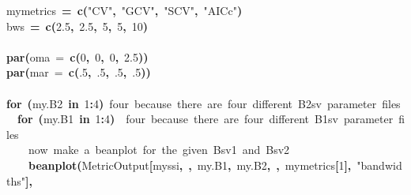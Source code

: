 \documentclass{article}
\makeatletter
\newcommand{\hlnumber}[1]{\textcolor[rgb]{0,0,0}{#1}}%
\newcommand{\hlfunctioncall}[1]{\textcolor[rgb]{0.501960784313725,0,0.329411764705882}{\textbf{#1}}}%
\newcommand{\hlstring}[1]{\textcolor[rgb]{0.6,0.6,1}{#1}}%
\newcommand{\hlkeyword}[1]{\textcolor[rgb]{0,0,0}{\textbf{#1}}}%
\newcommand{\hlargument}[1]{\textcolor[rgb]{0.690196078431373,0.250980392156863,0.0196078431372549}{#1}}%
\newcommand{\hlcomment}[1]{\textcolor[rgb]{0.180392156862745,0.6,0.341176470588235}{#1}}%
\newcommand{\hlassignement}[1]{\textcolor[rgb]{0,0,0}{\textbf{#1}}}%
\newcommand{\hlsymbol}[1]{\textcolor[rgb]{0,0,0}{#1}}%
\newcommand{\hlstd}[1]{\textcolor[rgb]{0,0,0}{#1}}%
\newenvironment{kframe}{%
 \def\FrameCommand##1{\hskip\@totalleftmargin \hskip-\fboxsep
 \colorbox{shadecolor}{##1}\hskip-\fboxsep
     \hskip-\linewidth \hskip-\@totalleftmargin \hskip\columnwidth}%
 \MakeFramed {\advance\hsize-\width
   \@totalleftmargin\z@ \linewidth\hsize
   \@setminipage}}%
 {\par\unskip\endMakeFramed}
\newenvironment{knitrout}{}{} %
\makeatother
\begin{document}
\begin{knitrout}
\begin{kframe}
\begin{flushleft}
\hlstd{}\hlsymbol{mymetrics}{\ }\hlassignement{=}{\ }\hlfunctioncall{c}\hlkeyword{(}\hlstring{"{}CV"{}}\hlkeyword{,}{\ }\hlstring{"{}GCV"{}}\hlkeyword{,}{\ }\hlstring{"{}SCV"{}}\hlkeyword{,}{\ }\hlstring{"{}AICc"{}}\hlkeyword{)}\hspace*{\fill}\\
\hlstd{}\hlsymbol{bws}{\ }\hlassignement{=}{\ }\hlfunctioncall{c}\hlkeyword{(}\hlnumber{2.5}\hlkeyword{,}{\ }\hlnumber{2.5}\hlkeyword{,}{\ }\hlnumber{5}\hlkeyword{,}{\ }\hlnumber{5}\hlkeyword{,}{\ }\hlnumber{10}\hlkeyword{)}\hspace*{\fill}\\
\hlstd{}\hspace*{\fill}\\
\hlstd{}\hlfunctioncall{par}\hlkeyword{(}\hlargument{oma}{\ }\hlargument{=}{\ }\hlfunctioncall{c}\hlkeyword{(}\hlnumber{0}\hlkeyword{,}{\ }\hlnumber{0}\hlkeyword{,}{\ }\hlnumber{0}\hlkeyword{,}{\ }\hlnumber{2.5}\hlkeyword{)}\hlkeyword{)}\hspace*{\fill}\\
\hlstd{}\hlfunctioncall{par}\hlkeyword{(}\hlargument{mar}{\ }\hlargument{=}{\ }\hlfunctioncall{c}\hlkeyword{(}\hlnumber{.5}\hlkeyword{,}{\ }\hlnumber{.5}\hlkeyword{,}{\ }\hlnumber{.5}\hlkeyword{,}{\ }\hlnumber{.5}\hlkeyword{)}\hlkeyword{)}\hspace*{\fill}\\
\hlstd{}\hspace*{\fill}\\
\hlstd{}\hlkeyword{for}{\ }\hlkeyword{(}\hlsymbol{my.B2}{\ }\hlkeyword{in}{\ }\hlnumber{1}\hlkeyword{:}\hlnumber{4}\hlkeyword{)}\hlkeyword{\usebox{\hlnormalsizeboxopenbrace}}{\ }\hlcomment{\usebox{\hlnormalsizeboxhash}{\ }four{\ }because{\ }there{\ }are{\ }four{\ }different{\ }B2sv{\ }parameter{\ }files}\hspace*{\fill}\\
\hlstd{}{\ }{\ }\hlkeyword{for}{\ }\hlkeyword{(}\hlsymbol{my.B1}{\ }\hlkeyword{in}{\ }\hlnumber{1}\hlkeyword{:}\hlnumber{4}\hlkeyword{)}{\ }\hlkeyword{\usebox{\hlnormalsizeboxopenbrace}}{\ }\hlcomment{\usebox{\hlnormalsizeboxhash}{\ }four{\ }because{\ }there{\ }are{\ }four{\ }different{\ }B1sv{\ }parameter{\ }files}\hspace*{\fill}\\
\hlstd{}{\ }{\ }{\ }{\ }\hlcomment{\usebox{\hlnormalsizeboxhash}{\ }now{\ }make{\ }a{\ }beanplot{\ }for{\ }the{\ }given{\ }Bsv1{\ }and{\ }Bsv2}\hspace*{\fill}\\
\hlstd{}{\ }{\ }{\ }{\ }\hlfunctioncall{beanplot}\hlkeyword{(}\hlsymbol{MetricOutput}\hlkeyword{[}\hlsymbol{myssi}\hlkeyword{,}{\ }\hlkeyword{,}{\ }\hlsymbol{my.B1}\hlkeyword{,}{\ }\hlsymbol{my.B2}\hlkeyword{,}{\ }\hlkeyword{,}{\ }\hlsymbol{mymetrics}\hlkeyword{[}\hlnumber{1}\hlkeyword{]}\hlkeyword{,}{\ }\hlstring{"{}bandwidths"{}}\hlkeyword{]}\hlkeyword{,}\hspace*{\fill}\\

\end{flushleft}
\end{kframe}
\end{knitrout}
\end{document}
